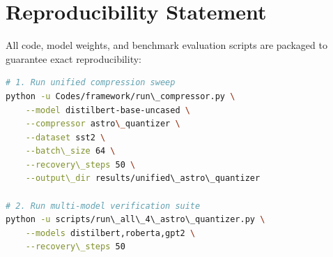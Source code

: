 \section{Reproducibility Statement}
All code, model weights, and benchmark evaluation scripts are packaged to guarantee exact reproducibility:
\begin{lstlisting}[language=bash]
# 1. Run unified compression sweep
python -u Codes/framework/run\_compressor.py \
    --model distilbert-base-uncased \
    --compressor astro\_quantizer \
    --dataset sst2 \
    --batch\_size 64 \
    --recovery\_steps 50 \
    --output\_dir results/unified\_astro\_quantizer

# 2. Run multi-model verification suite
python -u scripts/run\_all\_4\_astro\_quantizer.py \
    --models distilbert,roberta,gpt2 \
    --recovery\_steps 50
\end{lstlisting}
